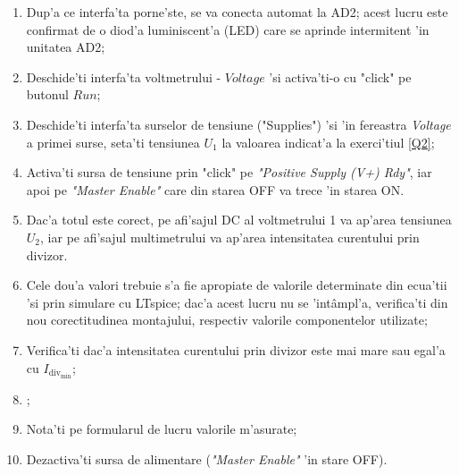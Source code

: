 \begin{exercise} 
\begin{enumerate}
\item Dup'a ce interfa'ta porne'ste, se va conecta automat la AD2; acest lucru este confirmat de o diod'a luminiscent'a (LED) care se aprinde intermitent 'in unitatea AD2;
\item Deschide'ti interfa'ta voltmetrului - $Voltage$ 'si activa'ti-o cu "click" pe butonul $Run$;
\item Deschide'ti interfa'ta surselor de tensiune ("Supplies") 'si 'in fereastra \textit{Voltage} a primei surse, seta'ti tensiunea $U_1$ la valoarea indicat'a la exerci'tiul \ref{Q2};
\item Activa'ti sursa de tensiune prin "click" pe \textit{"Positive Supply (V+) Rdy"}, iar apoi pe \textit{"Master Enable"} care din starea OFF va trece 'in starea ON.
\item Dac'a totul este corect, pe afi'sajul DC al voltmetrului 1 va ap'area tensiunea $U_2$, iar pe afi'sajul multimetrului va ap'area intensitatea curentului prin divizor.
\item Cele dou'a valori trebuie s'a fie apropiate de valorile determinate din ecua'tii 'si prin simulare cu LTspice; dac'a acest lucru nu se 'int\^ampl'a, verifica'ti din nou corectitudinea montajului, respectiv valorile componentelor utilizate;
\item Verifica'ti dac'a intensitatea curentului prin divizor este mai mare sau egal'a cu $I_{\mathrm{div}_{\mathrm{min}}}$;
\item {\color{blue}{Pentru determinarea cu precizie bun'a a tensiunii de ie'sire $U_2$, elimina'ti ampermetrul din circuit, 'intruc\^at rezisten'ta sa intern'a modific'a raportul de divizare a divizorului de tensiune}};
\item Nota'ti pe formularul de lucru valorile m'asurate;
\item Dezactiva'ti sursa de alimentare (\textit{"Master Enable"} 'in stare OFF). 
\end{enumerate}
\end{exercise}
%

